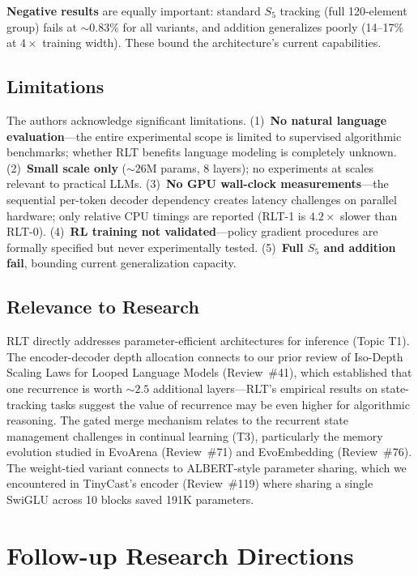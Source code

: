 \documentclass[11pt,a4paper]{article}
\begin{document}
\textbf{Negative results} are equally important: standard $S_5$ tracking (full 120-element group) fails at ${\sim}0.83\%$ for all variants, and addition generalizes poorly (14--17\% at $4\times$ training width). These bound the architecture's current capabilities.

\subsection{Limitations}
The authors acknowledge significant limitations. (1)~\textbf{No natural language evaluation}---the entire experimental scope is limited to supervised algorithmic benchmarks; whether RLT benefits language modeling is completely unknown. (2)~\textbf{Small scale only} (${\sim}26$M params, 8 layers); no experiments at scales relevant to practical LLMs. (3)~\textbf{No GPU wall-clock measurements}---the sequential per-token decoder dependency creates latency challenges on parallel hardware; only relative CPU timings are reported (RLT-1 is $4.2\times$ slower than RLT-0). (4)~\textbf{RL training not validated}---policy gradient procedures are formally specified but never experimentally tested. (5)~\textbf{Full $S_5$ and addition fail}, bounding current generalization capacity.

\subsection{Relevance to Research}
RLT directly addresses parameter-efficient architectures for inference (Topic T1). The encoder-decoder depth allocation connects to our prior review of Iso-Depth Scaling Laws for Looped Language Models (Review~\#41), which established that one recurrence is worth ${\sim}2.5$ additional layers---RLT's empirical results on state-tracking tasks suggest the value of recurrence may be even higher for algorithmic reasoning. The gated merge mechanism relates to the recurrent state management challenges in continual learning (T3), particularly the memory evolution studied in EvoArena (Review~\#71) and EvoEmbedding (Review~\#76). The weight-tied variant connects to ALBERT-style parameter sharing, which we encountered in TinyCast's encoder (Review~\#119) where sharing a single SwiGLU across 10 blocks saved 191K parameters.

\section{Follow-up Research Directions}
\end{document}
